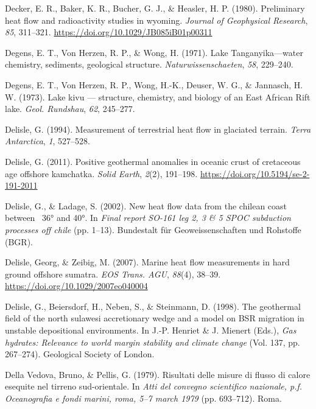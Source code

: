 \documentclass[draft,linenumbers]{agujournal2018}
\begin{document}
\leavevmode{}%
Decker, E. R., Baker, K. R., Bucher, G. J., \& Heasler, H. P. (1980).
Preliminary heat flow and radioactivity studies in wyoming.
\emph{Journal of Geophysical Research}, \emph{85}, 311--321.
\url{https://doi.org/10.1029/JB085iB01p00311}

\leavevmode{}%
Degens, E. T., Von Herzen, R. P., \& Wong, H. (1971). Lake
{Tanganyika}---water chemistry, sediments, geological structure.
\emph{Naturwissenschaeten}, \emph{58}, 229--240.

\leavevmode{}%
Degens, E. T., Von Herzen, R. P., Wong, H.-K., Deuser, W. G., \&
Jannasch, H. W. (1973). Lake kivu --- structure, chemistry, and biology
of an {East African Rift} lake. \emph{Geol. Rundshau}, \emph{62},
245--277.

\leavevmode{}%
Delisle, G. (1994). Measurement of terrestrial heat flow in glaciated
terrain. \emph{Terra Antarctica}, \emph{1}, 527--528.

\leavevmode{}%
Delisle, G. (2011). Positive geothermal anomalies in oceanic crust of
cretaceous age offshore kamchatka. \emph{Solid Earth}, \emph{2}(2),
191--198. \url{https://doi.org/10.5194/se-2-191-2011}

\leavevmode{}%
Delisle, G., \& Ladage, S. (2002). New heat flow data from the chilean
coast between ~36° and 40°. In \emph{Final report SO-161 leg 2, 3 \& 5
SPOC subduction processes off chile} (pp. 1--13). Bundestalt für
Geoweissenschaften und Rohstoffe (BGR).

\leavevmode{}%
Delisle, Georg, \& Zeibig, M. (2007). Marine heat flow measurements in
hard ground offshore sumatra. \emph{EOS Trans. AGU}, \emph{88}(4),
38--39. \url{https://doi.org/10.1029/2007eo040004}

\leavevmode{}%
Delisle, G., Beiersdorf, H., Neben, S., \& Steinmann, D. (1998). The
geothermal field of the north sulawesi accretionary wedge and a model on
BSR migration in unstable depositional environments. In J.-P. Henriet \&
J. Mienert (Eds.), \emph{Gas hydrates: Relevance to world margin
stability and climate change} (Vol. 137, pp. 267--274). Geological
Society of London.

\leavevmode{}%
Della Vedova, Bruno, \& Pellis, G. (1979). Risultati delle misure di
flusso di calore esequite nel tirreno sud-orientale. In \emph{Atti del
convegno scientifico nazionale, p.f. Oceanografia e fondi marini, roma,
5--7 march 1979} (pp. 693--712). Roma.
\end{document}
